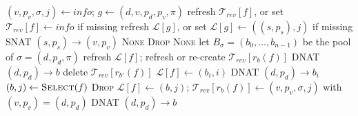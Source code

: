 \documentclass[conference]{IEEEtran}
\begin{document}
\begin{algorithm}[t]
\caption{\textsc{LoadBalance}$(f, \rho, \textit{kind}, \textit{info})$, $f=(s,d,p_s,p_d,\pi)$}
\label{alg:lb}
\begin{algorithmic}[1]
  \STATE $(v,p_v,\sigma,j) \gets \textit{info}$;
         $g \gets (d, v, p_d, p_v, \pi)$ 
  \STATE refresh $\mathcal{T}_{rev}[f]$, or set $\mathcal{T}_{rev}[f] \gets \textit{info}$ if missing
  \STATE refresh $\mathcal{L}[g]$, or set $\mathcal{L}[g] \gets ((s,p_s), j)$ if missing
  \RETURN SNAT $(s,p_s) \to (v,p_v)$
\ENDIF
{}
  \RETURN \textsc{None}
\ENDIF
{}
    \RETURN \textsc{Drop} 
  \ENDIF
  \RETURN \textsc{None}
\ENDIF
\STATE let $B_\sigma=(b_0,\dots,b_{n-1})$ be the pool of $\sigma=(d,p_d,\pi)$
  \STATE refresh $\mathcal{L}[f]$; refresh or re-create $\mathcal{T}_{rev}[r_b(f)]$
  \RETURN DNAT $(d,p_d) \to b$
  \STATE delete $\mathcal{T}_{rev}[r_{b'}(f)]$ 
  \STATE $\mathcal{L}[f] \gets (b_i,i)$ 
  \RETURN DNAT $(d,p_d) \to b_i$
\ENDIF
\STATE $(b,j) \gets \textsc{Select}(f)$ 
  \RETURN \textsc{Drop} 
\ENDIF
\STATE $\mathcal{L}[f] \gets (b,j)$;
       $\mathcal{T}_{rev}[r_b(f)] \gets (v,p_v,\sigma,j)$ with $(v,p_v)=(d,p_d)$
\RETURN DNAT $(d,p_d) \to b$
\end{algorithmic}
\end{algorithm}
\end{document}
